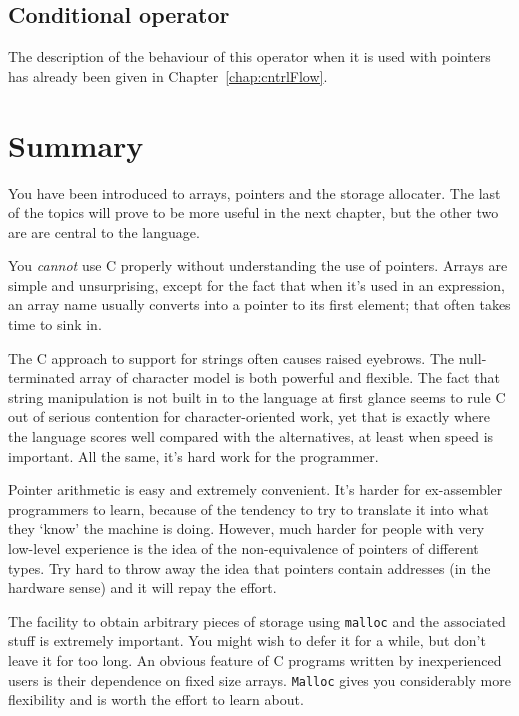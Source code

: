   

  \subsection{Conditional operator}
   

   The description of the behaviour of this operator when it is used with
     pointers has already been given in Chapter~\ref{chap:cntrlFlow}.


  

 
        \section{Summary}
        


  You have been introduced to arrays, pointers and the storage allocater.
   The last of the topics will prove to be more useful in the next chapter,
   but the other two are are central to the language.


  You \textit{cannot} use C properly without understanding the use of
   pointers. Arrays are simple and unsurprising, except for the fact that
   when it's used in an expression, an array name usually converts into
   a pointer to its first element; that often takes time to sink in.


  The C approach to support for strings often causes raised eyebrows. The
   null-terminated array of character model is both powerful and flexible.
   The fact that string manipulation is not built in to the language at
   first glance seems to rule C out of serious contention for
   character-oriented work, yet that is exactly where the language scores
   well compared with the alternatives, at least when speed is important.
   All the same, it's hard work for the programmer.


  Pointer arithmetic is easy and extremely convenient. It's harder for
   ex-assembler programmers to learn, because of the tendency to try to
   translate it into what they `know' the machine is doing. However,
   much harder for people with very low-level experience is the idea of the
   non-equivalence of pointers of different types. Try hard to throw away
   the idea that pointers contain addresses (in the hardware sense) and it
   will repay the effort.


  The facility to obtain arbitrary pieces of storage using
   \texttt{malloc} and the associated stuff is extremely important. You
   might wish to defer it for a while, but don't leave it for too long. An
   obvious feature of C programs written by inexperienced users is their
   dependence on fixed size arrays. \texttt{Malloc} gives you
   considerably more flexibility and is worth the effort to learn about.


